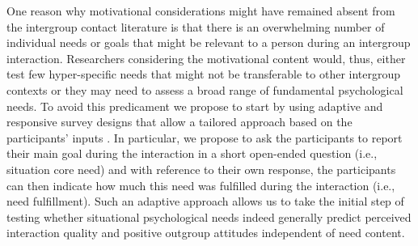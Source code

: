 \documentclass[man, 12pt, a4paper, mask]{apa7}
\theoremstyle{break}
\theoremstyle{plain}
\begin{document}
One reason why motivational considerations might have remained absent from the intergroup contact literature is that there is an overwhelming number of individual needs or goals that might be relevant to a person during an intergroup interaction. Researchers considering the motivational content would, thus, either test few hyper-specific needs that might not be transferable to other intergroup contexts or they may need to assess a broad range of fundamental psychological needs. To avoid this predicament we propose to start by using adaptive and responsive survey designs that allow a tailored approach based on the participants' inputs \citep[e.g.,][]{Tourangeau2017}. In particular, we propose to ask the participants to report their main goal during the interaction in a short open-ended question (i.e., situation core need) and with reference to their own response, the participants can then indicate how much this need was fulfilled during the interaction (i.e., need fulfillment). Such an adaptive approach allows us to take the initial step of testing whether situational psychological needs indeed generally predict perceived interaction quality and positive outgroup attitudes independent of need content. 
\end{document}

